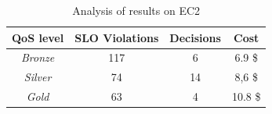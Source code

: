 






\begin{table}
  {\scriptsize 
\begin{center}
    \begin{tabular}{  | c | c | c | c |}
    \hline
         \textbf{QoS level}  & \textbf{SLO Violations} & \textbf{Decisions}  & \textbf{Cost}  \\ \hline
   \textit{Bronze}   &  117 &  6 &  6.9 \$ \\ \hline   
   \textit{Silver}  &  74 &  14 &  8,6 \$ \\ \hline   
\textit{Gold} &   63  &  4 &  10.8 \$  \\ \hline   

 \end{tabular}
\end{center}
\vspace{-3mm}
\caption{Analysis of results on EC2}
\label{summaryEC2}
}
\end{table}




